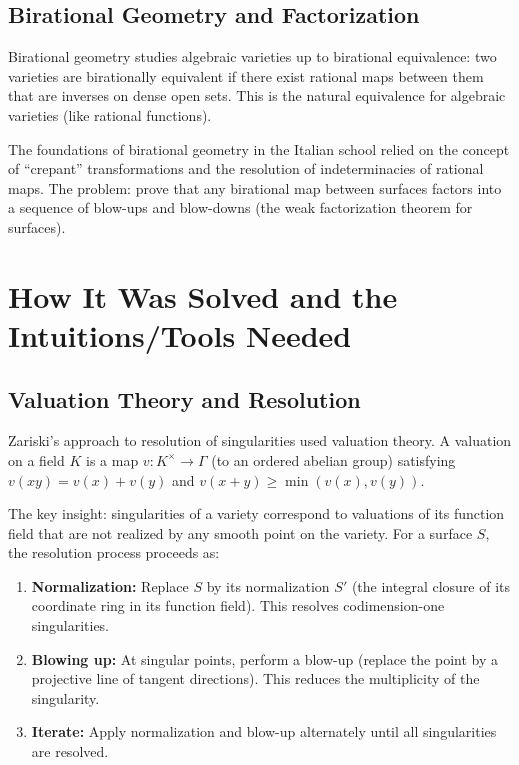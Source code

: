 \subsection{Birational Geometry and Factorization}

Birational geometry studies algebraic varieties up to birational equivalence: two varieties are birationally equivalent if there exist rational maps between them that are inverses on dense open sets. This is the natural equivalence for algebraic varieties (like rational functions).

The foundations of birational geometry in the Italian school relied on the concept of ``crepant'' transformations and the resolution of indeterminacies of rational maps. The problem: prove that any birational map between surfaces factors into a sequence of blow-ups and blow-downs (the weak factorization theorem for surfaces).

\section{How It Was Solved and the Intuitions/Tools Needed}

\subsection{Valuation Theory and Resolution}

Zariski's approach to resolution of singularities used valuation theory. A valuation on a field $K$ is a map $v: K^\times \to \Gamma$ (to an ordered abelian group) satisfying $v(xy) = v(x) + v(y)$ and $v(x + y) \geq \min(v(x), v(y))$.

The key insight: singularities of a variety correspond to valuations of its function field that are not realized by any smooth point on the variety. For a surface $S$, the resolution process proceeds as:

\begin{enumerate}
    \item \textbf{Normalization:} Replace $S$ by its normalization $S'$ (the integral closure of its coordinate ring in its function field). This resolves codimension-one singularities.
    \item \textbf{Blowing up:} At singular points, perform a blow-up (replace the point by a projective line of tangent directions). This reduces the multiplicity of the singularity.
    \item \textbf{Iterate:} Apply normalization and blow-up alternately until all singularities are resolved.
\end{enumerate}

